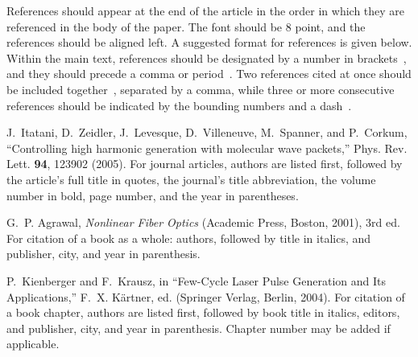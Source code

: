 \documentclass{epsconf}
\begin{document}
References should appear at the end of the article in the order in which they are referenced in the body of the paper. The font should be 8 point, and the references should be aligned left. A suggested format for references is given below. Within the main text, references should be designated by a number in brackets~\cite{itatani2005controlling}, and they should precede a comma or period~\cite{agrawal2001nonlinear}. Two references cited at once should be included together~\cite{itatani2005controlling, agrawal2001nonlinear}, separated by a comma, while three or more consecutive references should be indicated by the bounding numbers and a dash~\cite{itatani2005controlling, agrawal2001nonlinear, kienberger2004subfemto}.

\begin{thebibliography}{1}
  \newcommand{\enquote}[1]{``#1''}

  J.~Itatani, D.~Zeidler, J.~Levesque, D.~Villeneuve, M.~Spanner, and
  P.~Corkum,
  \enquote{Controlling high harmonic generation with molecular wave packets,}
  Phys. Rev. Lett. \textbf{94}, 123902 (2005).
  For journal articles, authors are listed first, followed by the article's
  full title in quotes, the journal's title abbreviation, the volume number
  in bold, page number, and the year in parentheses.

  G.~P. Agrawal, \emph{Nonlinear Fiber Optics} (Academic Press, Boston, 2001),
  3rd ed.
  For citation of a book as a whole: authors, followed by title in italics,
  and publisher, city, and year in parenthesis.

  P.~Kienberger and F.~Krausz, in \enquote{Few-Cycle Laser Pulse Generation and
    Its Applications,}  F.~X. Kärtner, ed. (Springer Verlag, Berlin, 2004).
  For citation of a book chapter, authors are listed first, followed by book
  title in italics, editors, and publisher, city, and year in parenthesis.
  Chapter number may be added if applicable.

\end{thebibliography}
\end{document}
